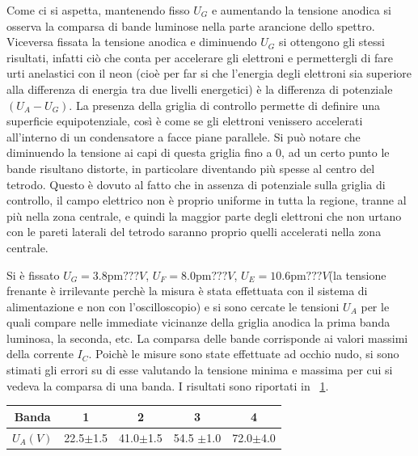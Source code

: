 \documentclass[10pt,a4paper]{article}
\begin{document}
Come ci si aspetta, mantenendo fisso $U_{G}$ e aumentando la tensione anodica si osserva la comparsa di bande luminose nella parte arancione dello spettro.
Viceversa fissata la tensione anodica e diminuendo $U_{G}$ si ottengono gli stessi risultati, infatti ciò che conta per accelerare gli elettroni e permettergli di fare urti anelastici con il neon (cioè per far si che l'energia degli elettroni sia superiore alla differenza di energia tra due livelli energetici) è la differenza di potenziale $(U_{A}-U_{G})$.
La presenza della griglia di controllo permette di definire una superficie equipotenziale, così è come se gli elettroni venissero accelerati all'interno di un condensatore a facce piane parallele. Si può notare che diminuendo la tensione ai capi di questa griglia fino a 0, ad un certo punto le bande risultano distorte, in particolare diventando più spesse al centro del tetrodo. Questo è dovuto al fatto che in assenza di potenziale sulla griglia di controllo, il campo elettrico non è proprio uniforme in tutta la regione, tranne al più nella zona centrale, e quindi la maggior parte degli elettroni che non urtano con le pareti laterali del tetrodo saranno proprio quelli accelerati nella zona centrale.


Si è fissato $U_{G} = \unit{3.8 \pm ???}{V}$, $U_{F}=\unit{8.0 \pm ???}{V}$, $U_{E} = \unit{10.6 \pm ???}{V}$(la tensione frenante è irrilevante perchè la misura è stata effettuata con il sistema di alimentazione e non con l'oscilloscopio) e si sono cercate le tensioni $U_{A}$ per le quali compare nelle immediate vicinanze della griglia anodica la prima banda luminosa, la seconda, etc. La comparsa delle bande corrisponde ai valori massimi della corrente $I_{C}$. Poichè le misure sono state effettuate ad occhio nudo, si sono stimati gli errori su di esse valutando la tensione minima e massima per cui si vedeva la comparsa di una banda. I risultati sono riportati in \tablename{~\ref{tab:massimi}}.

\begin{table}[h!]
\centering
\begin{tabular}{c|c|c|c|c}
\hline
Banda &1&2&3&4\\
\hline 
$U_{A} (V)$ & 22.5$\pm$1.5 & 41.0$\pm$1.5 & 54.5 $\pm$1.0 & 72.0$\pm$4.0  \\ 
\hline
\end{tabular}
\label{tab:massimi}
\end{table}
\end{document}
